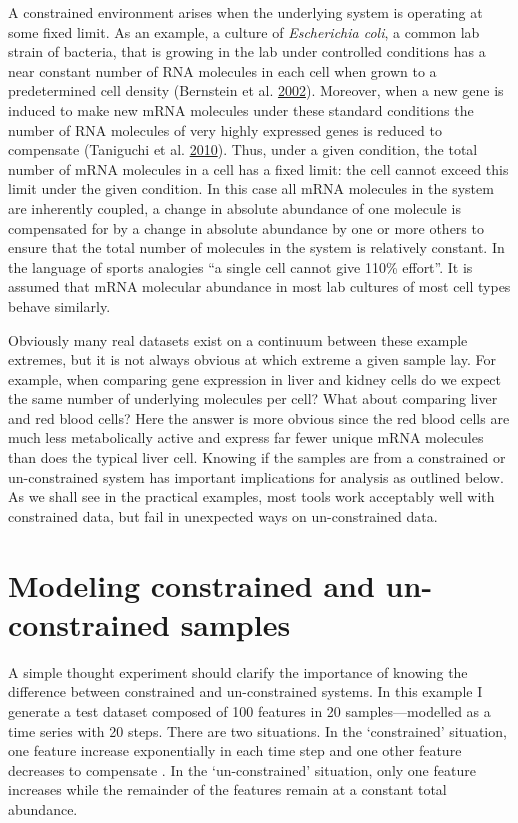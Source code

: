 \documentclass[onecolumn]{book}
\theoremstyle{definition}
\theoremstyle{definition}
\theoremstyle{definition}
\theoremstyle{remark}
\begin{document}
A constrained environment arises when the underlying system is operating
at some fixed limit. As an example, a culture of
\emph{Escherichia coli}, a common lab strain of bacteria, that is
growing in the lab under controlled conditions has a near constant
number of RNA molecules in each cell when grown to a predetermined cell
density (Bernstein et al. \protect\hyperlink{ref-mRNA:2002}{2002}).
Moreover, when a new gene is induced to make new mRNA molecules under
these standard conditions the number of RNA molecules of very highly
expressed genes is reduced to compensate (Taniguchi et al.
\protect\hyperlink{ref-Taniguchi:2010aa}{2010}). Thus, under a given
condition, the total number of mRNA molecules in a cell has a fixed
limit: the cell cannot exceed this limit under the given condition. In
this case all mRNA molecules in the system are inherently coupled, a
change in absolute abundance of one molecule is compensated for by a
change in absolute abundance by one or more others to ensure that the
total number of molecules in the system is relatively constant. In the
language of sports analogies ``a single cell cannot give 110\% effort''.
It is assumed that mRNA molecular abundance in most lab cultures of most
cell types behave similarly.

Obviously many real datasets exist on a continuum between these example
extremes, but it is not always obvious at which extreme a given sample
lay. For example, when comparing gene expression in liver and kidney
cells do we expect the same number of underlying molecules per cell?
What about comparing liver and red blood cells? Here the answer is more
obvious since the red blood cells are much less metabolically active and
express far fewer unique mRNA molecules than does the typical liver
cell. Knowing if the samples are from a constrained or un-constrained
system has important implications for analysis as outlined below. As we
shall see in the practical examples, most tools work acceptably well
with constrained data, but fail in unexpected ways on un-constrained
data.

\hypertarget{modeling-constrained-and-un-constrained-samples}{%
\section{Modeling constrained and un-constrained
samples}\label{modeling-constrained-and-un-constrained-samples}}

A simple thought experiment should clarify the importance of knowing the
difference between constrained and un-constrained systems. In this
example I generate a test dataset composed of 100 features in 20
samples---modelled as a time series with 20 steps. There are two
situations. In the `constrained' situation, one feature increase
exponentially in each time step and one other feature decreases to
compensate . In the `un-constrained' situation, only one feature
increases while the remainder of the features remain at a constant total
abundance.
\end{document}
